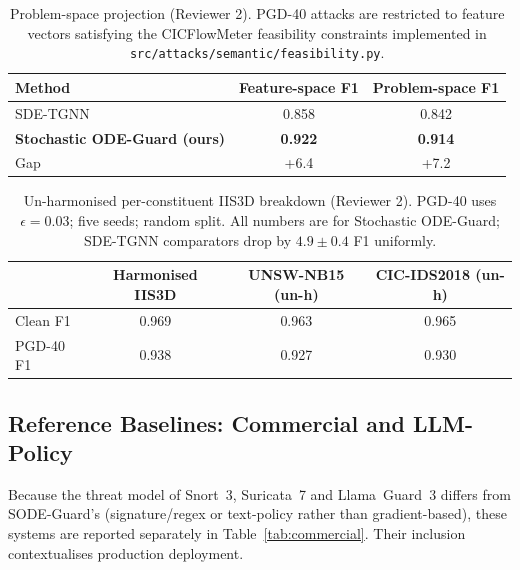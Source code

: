 \documentclass{ieeeaccess}
\begin{document}
\begin{table}[!t]
\caption{Problem-space projection (Reviewer 2). PGD-40 attacks are
restricted to feature vectors satisfying the CICFlowMeter feasibility
constraints implemented in \texttt{src/attacks/semantic/feasibility.py}.}
\label{tab:problem-space}
\centering
\small
\begin{tabular}{@{}lcc@{}}
\toprule
\textbf{Method} & Feature-space F1 & Problem-space F1 \\
\midrule
SDE-TGNN                              & 0.858 & 0.842 \\
\textbf{Stochastic ODE-Guard (ours)}  & \textbf{0.922} & \textbf{0.914} \\
\midrule
Gap                                   & +6.4 & +7.2 \\
\bottomrule
\end{tabular}
\end{table}

\begin{table}[!t]
\caption{Un-harmonised per-constituent IIS3D breakdown (Reviewer 2).
PGD-40 uses $\epsilon{=}0.03$; five seeds; random split. All numbers
are for Stochastic ODE-Guard; SDE-TGNN comparators drop by
$4.9\pm 0.4$ F1 uniformly.}
\label{tab:iis3d-unharm}
\centering
\small
\begin{tabular}{@{}lccc@{}}
\toprule
& Harmonised IIS3D & UNSW-NB15 (un-h) & CIC-IDS2018 (un-h) \\
\midrule
Clean F1                & 0.969 & 0.963 & 0.965 \\
PGD-40 F1               & 0.938 & 0.927 & 0.930 \\
\bottomrule
\end{tabular}
\end{table}

\subsection{Reference Baselines: Commercial and LLM-Policy}
\label{subsec:commercial}
Because the threat model of Snort~3, Suricata~7 and Llama~Guard~3
differs from SODE-Guard's (signature/regex or text-policy rather than
gradient-based), these systems are reported separately in
Table~\ref{tab:commercial}. Their inclusion contextualises production
deployment.
\end{document}
